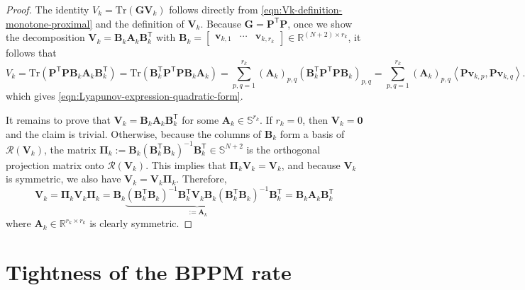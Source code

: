 \documentclass{article}
\theoremstyle{definition}
\theoremstyle{plain}
\newcommand{\vv}{{\mathbf{v}}}
\newcommand{\vA}{{\mathbf{A}}}
\newcommand{\vB}{{\mathbf{B}}}
\newcommand{\vG}{{\mathbf{G}}}
\newcommand{\vP}{{\mathbf{P}}}
\newcommand{\vV}{{\mathbf{V}}}
\newcommand{\cR}{{\mathcal{R}}}
\newcommand{\Tr}{{\mathrm{Tr}}}
\newcommand{\reals}{\mathbb{R}}
\newcommand{\inprod}[2]{\left\langle #1,#2 \right\rangle}
\newcommand{\transpose}{\mathsf{T}}
\begin{document}
\begin{proof}
The identity $V_k=\Tr(\vG\vV_k)$ follows directly from
\eqref{eqn:Vk-definition-monotone-proximal} and the definition of $\vV_k$.
Because $\vG=\vP^\transpose \vP$, once we show the decomposition $\vV_k = \vB_k \vA_k \vB_k^\transpose$ with $\vB_k=\begin{bmatrix} \vv_{k,1} & \cdots & \vv_{k,r_k} \end{bmatrix} \in \reals^{(N+2)\times r_k}$, 
it follows that 
\[
    V_k
    =
    \Tr(\vP^\transpose \vP \vB_k \vA_k \vB_k^\transpose)
    =
    \Tr(\vB_k^\transpose \vP^\transpose \vP \vB_k \vA_k)
    =
    \sum_{p,q=1}^{r_k}(\vA_k)_{p,q}
    \left( \vB_k^\transpose \vP^\transpose \vP \vB_k \right)_{p,q}
    =
    \sum_{p,q=1}^{r_k}(\vA_k)_{p,q}
    \inprod{\vP\vv_{k,p}}{\vP\vv_{k,q}} .
\]
which gives \eqref{eqn:Lyapunov-expression-quadratic-form}.

It remains to prove that $\vV_k = \vB_k \vA_k \vB_k^\transpose$ for some $\vA_k \in \mathbb{S}^{r_k}$. If $r_k=0$, then $\vV_k=\mathbf{0}$ and the claim is trivial. Otherwise, because the columns of $\vB_k$ form a basis of $\cR(\vV_k)$, the matrix $\boldsymbol{\Pi}_k := \vB_k(\vB_k^\transpose \vB_k)^{-1}\vB_k^\transpose \in \mathbb{S}^{N+2}$ is the orthogonal projection matrix onto $\cR(\vV_k)$. 
This implies that $\boldsymbol{\Pi}_k \vV_k = \vV_k$, and because $\vV_k$ is symmetric, we also have $\vV_k = \vV_k \boldsymbol{\Pi}_k$. Therefore,
\[
    \vV_k = \boldsymbol{\Pi}_k \vV_k \boldsymbol{\Pi}_k = \vB_k \underbrace{
        (\vB_k^\transpose \vB_k)^{-1}\vB_k^\transpose
        \vV_k
        \vB_k(\vB_k^\transpose \vB_k)^{-1}
    }_{:=\vA_k} \vB_k^\transpose = \vB_k \vA_k \vB_k^\transpose
\]
where $\vA_k \in \reals^{r_k \times r_k}$ is clearly symmetric.

\end{proof}

\section{Tightness of the BPPM rate}
\label{appendix:bppm-tightness}
\end{document}
